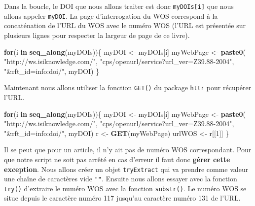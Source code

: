 \documentclass[]{book}
\newenvironment{Shaded}{\begin{snugshade}}{\end{snugshade}}
\newcommand{\ControlFlowTok}[1]{\textcolor[rgb]{0.13,0.29,0.53}{\textbf{#1}}}
\newcommand{\DecValTok}[1]{\textcolor[rgb]{0.00,0.00,0.81}{#1}}
\newcommand{\KeywordTok}[1]{\textcolor[rgb]{0.13,0.29,0.53}{\textbf{#1}}}
\newcommand{\NormalTok}[1]{#1}
\newcommand{\StringTok}[1]{\textcolor[rgb]{0.31,0.60,0.02}{#1}}
\begin{document}
Dans la boucle, le DOI que nous allons traiter est donc \texttt{myDOIs{[}i{]}} que nous allons appeler \texttt{myDOI}. La page d'interrogation du WOS correspond à la concaténation de l'URL du WOS avec le numéro WOS (l'URL est présentée sur plusieurs lignes pour respecter la largeur de page de ce livre).

\begin{Shaded}
\begin{Highlighting}[]
\ControlFlowTok{for}\NormalTok{(i }\ControlFlowTok{in} \KeywordTok{seq_along}\NormalTok{(myDOIs))\{}
\NormalTok{  myDOI <-}\StringTok{ }\NormalTok{myDOIs[i]}
\NormalTok{  myWebPage <-}\StringTok{ }\KeywordTok{paste0}\NormalTok{(}
    \StringTok{"http://ws.isiknowledge.com/"}\NormalTok{, }
    \StringTok{"cps/openurl/service?url_ver=Z39.88-2004"}\NormalTok{, }
    \StringTok{"&rft_id=info:doi/"}\NormalTok{, myDOI)}
\NormalTok{\}}
\end{Highlighting}
\end{Shaded}

Maintenant nous allons utiliser la fonction \texttt{GET()} du package \texttt{httr} pour récupérer l'URL.

\begin{Shaded}
\begin{Highlighting}[]
\ControlFlowTok{for}\NormalTok{(i }\ControlFlowTok{in} \KeywordTok{seq_along}\NormalTok{(myDOIs))\{}
\NormalTok{  myDOI <-}\StringTok{ }\NormalTok{myDOIs[i]}
\NormalTok{  myWebPage <-}\StringTok{ }\KeywordTok{paste0}\NormalTok{(}
    \StringTok{"http://ws.isiknowledge.com/"}\NormalTok{, }
    \StringTok{"cps/openurl/service?url_ver=Z39.88-2004"}\NormalTok{, }
    \StringTok{"&rft_id=info:doi/"}\NormalTok{, myDOI)}
\NormalTok{  r <-}\StringTok{ }\KeywordTok{GET}\NormalTok{(myWebPage)}
\NormalTok{  urlWOS <-}\StringTok{ }\NormalTok{r[[}\DecValTok{1}\NormalTok{]]}
\NormalTok{\}}
\end{Highlighting}
\end{Shaded}

Il se peut que pour un article, il n'y ait pas de numéro WOS correspondant. Pour que notre script ne soit pas arrêté en cas d'erreur il faut donc \textbf{gérer cette exception}. Nous allons créer un objet \texttt{tryExtract} qui va prendre comme valeur une chaîne de caractères vide \texttt{""}. Ensuite nous allons essayer avec la fonction \texttt{try()} d'extraire le numéro WOS avec la fonction \texttt{substr()}. Le numéro WOS se situe depuis le caractère numéro 117 jusqu'au caractère numéro 131 de l'URL.
\end{document}
